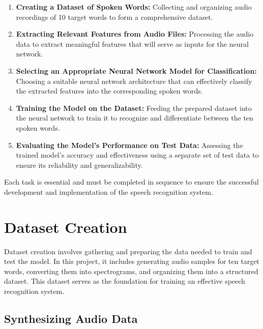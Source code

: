 \documentclass[12pt]{article}
\begin{document}
\begin{enumerate}
    \item \textbf{Creating a Dataset of Spoken Words:} Collecting and organizing audio recordings of 10 target words to form a comprehensive dataset.
    \item \textbf{Extracting Relevant Features from Audio Files:} Processing the audio data to extract meaningful features that will serve as inputs for the neural network.
    \item \textbf{Selecting an Appropriate Neural Network Model for Classification:} Choosing a suitable neural network architecture that can effectively classify the extracted features into the corresponding spoken words.
    \item \textbf{Training the Model on the Dataset:} Feeding the prepared dataset into the neural network to train it to recognize and differentiate between the ten spoken words.
    \item \textbf{Evaluating the Model's Performance on Test Data:} Assessing the trained model's accuracy and effectiveness using a separate set of test data to ensure its reliability and generalizability.
\end{enumerate}

Each task is essential and must be completed in sequence to ensure the successful development and implementation of the speech recognition system.

\newpage




\section{Dataset Creation}

Dataset creation involves gathering and preparing the data needed to train and test the model. In this project, it includes generating audio samples for ten target words, converting them into spectrograms, and organizing them into a structured dataset. This dataset serves as the foundation for training an effective speech recognition system.

\subsection{Synthesizing Audio Data}
\end{document}
